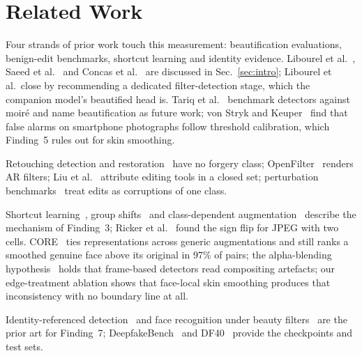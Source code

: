 \documentclass[conference]{IEEEtran}
\begin{document}
\section{Related Work}
\label{sec:related}
Four strands of prior work touch this measurement: beautification evaluations, benign-edit benchmarks, shortcut learning and identity evidence. Libourel et al.~\cite{libourel2024}, Saeed et al.~\cite{saeed2025} and Concas et al.~\cite{concas2025} are discussed in
Sec.~\ref{sec:intro}; Libourel et al.\ close by recommending a dedicated filter-detection stage, which the companion model's
beautified head is. Tariq et al.~\cite{moire2025} benchmark detectors against moir\'e and name beautification as future work; von Stryk and
Keuper~\cite{laionmobile2026} find that false alarms on smartphone photographs follow threshold calibration, which Finding~5
rules out for skin smoothing.

Retouching detection and
restoration~\cite{bharati2016,jain2018,wang2019photoshop,retouchingffhq,frrffusion,mofrr,reface} have no forgery class;
OpenFilter~\cite{openfilter2022} renders AR filters; Liu et al.~\cite{miea2026} attribute editing tools in a closed set;
perturbation benchmarks~\cite{deeperforensics2020,hendrycks2019} treat edits as corruptions of one class.

Shortcut learning~\cite{geirhos2020}, group shifts~\cite{sagawa2020} and class-dependent augmentation~\cite{balestriero2022} describe
the mechanism of Finding~3; Ricker et al.~\cite{ricker2026biasid} found the sign flip for JPEG with two cells. CORE~\cite{core}
ties representations across generic augmentations and still ranks a smoothed genuine face above its original in 97\% of
pairs; the alpha-blending hypothesis~\cite{alphablend2026} holds that frame-based detectors read compositing artefacts; our
edge-treatment ablation shows that face-local skin smoothing produces that inconsistency with no boundary line at all.

Identity-referenced detection~\cite{identitydriven2020,idreveal2021,ict2022,yin2026,vipguard2025} and face recognition under beauty filters~\cite{mirabet2025} are the prior art for Finding~7; DeepfakeBench~\cite{deepfakebench} and
DF40~\cite{df40} provide the checkpoints and test sets.

\end{document}
